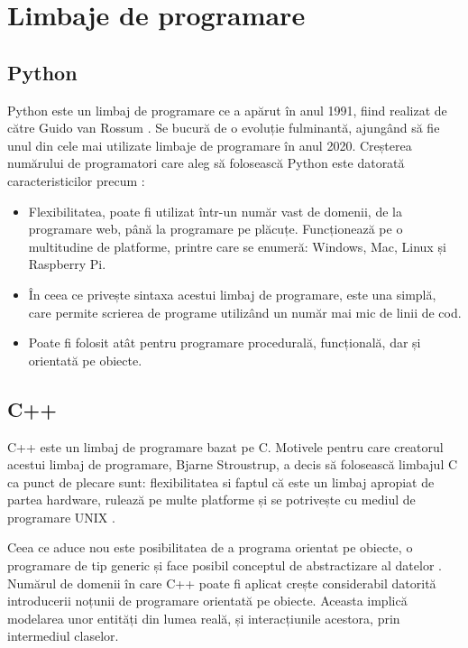 \section{Limbaje de programare}

\subsection{Python}

	Python este un limbaj de programare ce a apărut în anul 1991, fiind realizat de către Guido van Rossum \cite{python}. Se bucură de o evoluție fulminantă, ajungând să fie unul din cele mai utilizate limbaje de programare în anul 2020. Creșterea numărului de programatori care aleg să folosească Python este datorată  caracteristicilor precum \cite{python}: 
	\begin{itemize}
	\setlength{\itemindent}{2em}
	\itemsep0em
	\item Flexibilitatea, poate fi utilizat într-un număr vast de domenii, de la programare web, până la programare pe plăcuțe. Funcționează pe o multitudine de platforme, printre care se enumeră: Windows, Mac, Linux și Raspberry Pi. 
	\item În ceea ce privește sintaxa acestui limbaj de programare, este una simplă, care permite scrierea de programe utilizând un număr mai mic de linii de cod. 
	\item Poate fi folosit atât pentru programare procedurală, funcțională, dar și orientată pe obiecte.
	\end{itemize}

\subsection{C++}

	C++ este un limbaj de programare bazat pe C. Motivele pentru care creatorul acestui limbaj de programare, Bjarne Stroustrup, a decis să folosească limbajul C ca punct de plecare sunt: flexibilitatea si faptul că este un limbaj apropiat de partea hardware, rulează pe multe platforme și se potrivește cu mediul de programare UNIX \cite{c++}.

	Ceea ce aduce nou este posibilitatea de a programa orientat pe obiecte, o programare de tip generic și face posibil conceptul de abstractizare al datelor \cite{c++}. Numărul de domenii în care C++ poate fi aplicat crește considerabil datorită introducerii noțunii de programare orientată pe obiecte. Aceasta implică modelarea unor entități din lumea reală, și interacțiunile acestora, prin intermediul claselor. 

